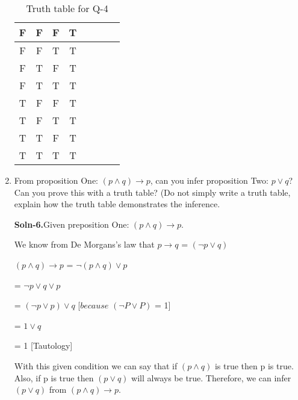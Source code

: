 \documentclass{article}
\begin{document}
\begin{enumerate}
\begin{table} [H]
\begin{tabular}{ | c | c | c | c | c | c | c | c | }
                \hline 
                F & F & F & T \\
                \hline
                F & F & T & T \\
                \hline
                F & T & F & T \\
                \hline
                F & T & T & T \\
                \hline
                T & F & F & T \\
                \hline
                T & F & T & T \\
                \hline
                T & T & F & T \\
                \hline
                T & T & T & T \\ [1ex]
                \hline
                \end{tabular}
                \caption{Truth table for Q-4}
                \label {table:5}
        \end{table}

\item   From proposition One: $(p \wedge q) \rightarrow p$, can you infer
        proposition Two: $p \vee q$?  Can you prove this with a truth
        table?  (Do not simply write a truth table, explain how the
        truth table demonstrates the inference.

        \textbf{Soln-6.}Given preposition One: $(p \wedge q) \rightarrow p$. \par
                        We know from De Morgans’s law that $p \rightarrow q$ = $(\neg p \vee q)$ \par
                        $(p \wedge q) \rightarrow p$ = $\neg (p \wedge q) \vee p$ \par
                                     = $\neg p \vee q \vee p$ \par
                                     = $(\neg p \vee p) \vee q$ [$ because $ $(\neg P \vee P)$ = 1] \par
                                     = $1 \vee q$ \par
                                     = 1 [Tautology] \par
        With this given condition we can say that if $(p \wedge q)$ is true then p is true. 
        Also, if p is true then $(p \vee q)$ will always be true. Therefore, we can infer $(p \vee q)$ from $(p \wedge q) \rightarrow p$.


\end{enumerate}
\end{document}
